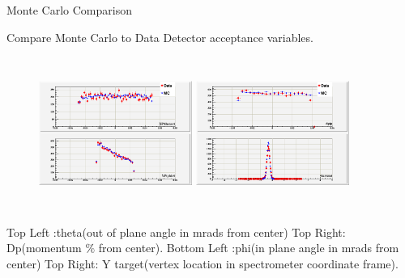 \documentclass{beamer}
\begin{document}
\begin{frame}{Monte Carlo Comparison}
		\vspace{-22pt}
	\begin{block}{Compare Monte Carlo to Data}
		Detector acceptance variables. 
		\vspace{-12pt}
		\begin{figure}[t]%
			\includegraphics[width=5cm,height=5cm]{../images/xp_yp_tar_1207.png}
			\includegraphics[width=5cm,height=5cm]{../images/dp_ytar_1207.png}
		\end{figure}
		\vspace{-12pt}	
		Top Left :theta(out of plane angle in mrads from center)  Top Right: Dp(momentum $\%$ from center).
		Bottom Left :phi(in plane angle in mrads from center)  Top Right: Y target(vertex location in spectrometer coordinate frame).
	\end{block}	
\end{frame}
\end{document}
